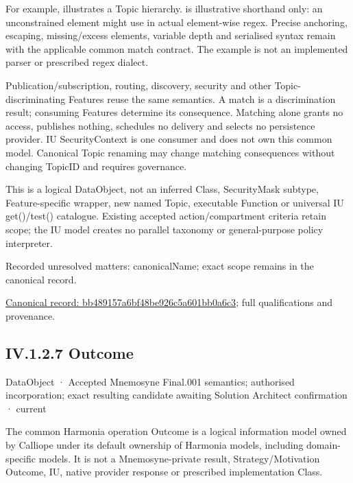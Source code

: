 For example, \texttt{}
illustrates a Topic hierarchy. \texttt{}
is illustrative shorthand only: an unconstrained element might use \texttt{} in actual
element-wise regex. Precise anchoring, escaping, missing/excess elements, variable
depth and serialised syntax remain with the applicable common match contract.
The example is not an implemented parser or prescribed regex dialect.



Publication/subscription, routing, discovery, security and other Topic-discriminating
Features reuse the same semantics. A match is a discrimination result; consuming
Features determine its consequence. Matching alone grants no access, publishes
nothing, schedules no delivery and selects no persistence provider. IU SecurityContext
is one consumer and does not own this common model. Canonical Topic renaming may
change matching consequences without changing TopicID and requires governance.



This is a logical DataObject, not an inferred Class, SecurityMask subtype,
Feature-specific wrapper, new named Topic, executable Function or universal IU
get()/test() catalogue. Existing accepted action/compartment criteria retain scope;
the IU model creates no parallel taxonomy or general-purpose policy interpreter.


{\small Recorded unresolved matters: canonicalName; exact scope remains in the canonical record.}\par
{\footnotesize \href{../../../../continuum/application/data-object/bb489157a6bf48be926c5a601bb0a6c3.md}{Canonical record: bb489157a6bf48be926c5a601bb0a6c3}; full qualifications and provenance.}\par
\subsection*{IV.1.2.7 Outcome}
\label{navigation:IV.1.2.7}

\label{element:6d43c35381a9438f9101cf1d8b530b19}
{\small DataObject · Accepted Mnemosyne Final.001 semantics; authorised incorporation; exact resulting candidate awaiting Solution Architect confirmation · current}\par

The common Harmonia operation Outcome is a logical information model owned by Calliope under its default ownership of Harmonia models, including domain-specific models. It is not a Mnemosyne-private result, Strategy/Motivation Outcome, IU, native provider response or prescribed implementation Class.




